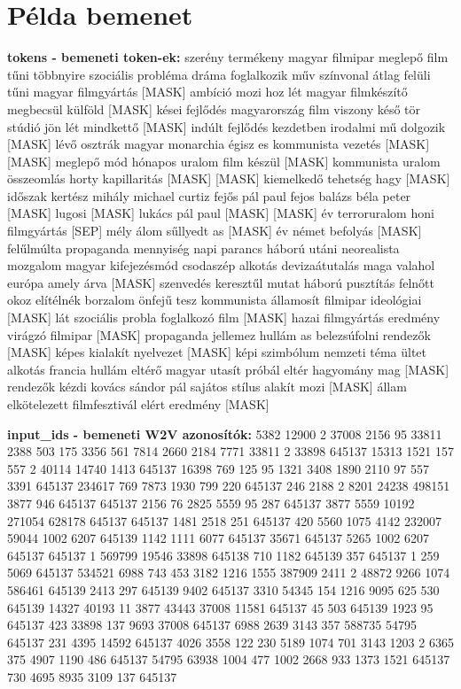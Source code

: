 \chapter{Példa bemenet}
\label{appx:input}

\textbf{tokens - bemeneti token-ek:}
szerény termékeny magyar filmipar meglepő film tűni többnyire szociális probléma dráma foglalkozik műv színvonal átlag felüli tűni magyar filmgyártás [MASK] ambíció mozi hoz lét magyar filmkészítő megbecsül külföld [MASK] kései fejlődés magyarország film viszony késő tör stúdió jön lét mindkettő [MASK] indúlt fejlődés kezdetben irodalmi mű dolgozik [MASK] lévő osztrák magyar monarchia égisz es kommunista vezetés [MASK] [MASK] meglepő mód hónapos uralom film készül [MASK] kommunista uralom összeomlás horty kapillaritás [MASK] [MASK] kiemelkedő tehetség hagy [MASK] időszak kertész mihály michael curtiz fejős pál paul fejos balázs béla peter [MASK] lugosi [MASK] lukács pál paul [MASK] [MASK] év terroruralom honi filmgyártás [SEP] mély álom sűllyedt as [MASK] év német befolyás [MASK] felűlmúlta propaganda mennyiség napi parancs háború utáni neorealista mozgalom magyar kifejezésmód csodaszép alkotás devizaátutalás maga valahol európa amely árva [MASK] szenvedés keresztűl mutat háború pusztítás felnőtt okoz elítélnék borzalom önfejű tesz kommunista államosít filmipar ideológiai [MASK] lát szociális probla foglalkozó film [MASK] hazai filmgyártás eredmény virágzó filmipar [MASK] propaganda jellemez hullám as belezsúfolni rendezők [MASK] képes kialakít nyelvezet [MASK] képi szimbólum nemzeti téma ültet alkotás francia hullám eltérő magyar utasít próbál eltér hagyomány mag [MASK] rendezők kézdi kovács sándor pál sajátos stílus alakít mozi [MASK] állam elkötelezett filmfesztivál elért eredmény [MASK]

\textbf{input\_ids - bemeneti W2V azonosítók:}
5382 12900 2 37008 2156 95 33811 2388 503 175 3356 561 7814 2660 2184 7771 33811 2 33898 645137 15313 1521 157 557 2 40114 14740 1413 645137 16398 769 125 95 1321 3408 1890 2110 97 557 3391 645137 234617 769 7873 1930 799 220 645137 246 2188 2 8201 24238 498151 3877 946 645137 645137 2156 76 2825 5559 95 287 645137 3877 5559 10192 271054 628178 645137 645137 1481 2518 251 645137 420 5560 1075 4142 232007 59044 1002 6207 645139 1142 1111 6077 645137 35671 645137 5265 1002 6207 645137 645137 1 569799 19546 33898 645138 710 1182 645139 357 645137 1 259 5069 645137 534521 6988 743 453 3182 1216 1555 387909 2411 2 48872 9266 1074 586461 645139 2413 297 645139 9402 645137 3310 54345 154 1216 9095 625 530 645139 14327 40193 11 3877 43443 37008 11581 645137 45 503 645139 1923 95 645137 423 33898 137 9693 37008 645137 6988 2639 3143 357 588735 54795 645137 231 4395 14592 645137 4026 3558 122 230 5189 1074 701 3143 1203 2 6365 375 4907 1190 486 645137 54795 63938 1004 477 1002 2668 933 1373 1521 645137 730 4695 8935 3109 137 645137

